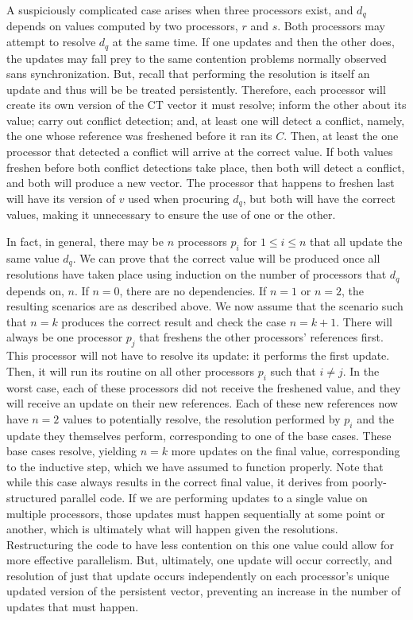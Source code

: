 A suspiciously complicated case arises when three processors exist, and $d_q$
depends on values computed by two processors, $r$ and $s$. Both processors may
attempt to resolve $d_q$ at the same time. If one updates and then the other
does, the updates may fall prey to the same contention problems normally
observed sans synchronization. But, recall that performing the resolution is
itself an update and thus will be be treated persistently. Therefore, each
processor will create its own version of the CT vector it must resolve; inform
the other about its value; carry out conflict detection; and, at least one will
detect a conflict, namely, the one whose reference was freshened before it ran
its $C$. Then, at least the one processor that detected a conflict will arrive
at the correct value. If both values freshen before both conflict detections
take place, then both will detect a conflict, and both will produce a new
vector. The processor that happens to freshen last will have its version of $v$
used when procuring $d_q$, but both will have the correct values, making it
unnecessary to ensure the use of one or the other.

In fact, in general, there may be $n$ processors $p_i$ for $1 \leq i \leq n$
that all update the same value $d_q$.  We can prove that the correct value will
be produced once all resolutions have taken place using induction on the number
of processors that $d_q$ depends on, $n$. If $n=0$, there are no dependencies.
If $n=1$ or $n=2$, the resulting scenarios are as described above. We now assume
that the scenario such that $n=k$ produces the correct result and check the case
$n=k+1$. There will always be one processor $p_j$ that freshens the other
processors' references first. This processor will not have to resolve its
update: it performs the first update. Then, it will run its routine on all
other processors $p_i$ such that $i \neq j$. In the worst case, each of these
processors did not receive the freshened value, and they will receive an update
on their new references. Each of these new references now have $n=2$ values to
potentially resolve, the resolution performed by $p_i$ and the update they
themselves perform, corresponding to one of the base cases. These base cases
resolve, yielding $n=k$ more updates on the final value, corresponding to the
inductive step, which we have assumed to function properly. Note that while this
case always results in the correct final value, it derives from
poorly-structured parallel code. If we are performing updates to a single value
on multiple processors, those updates must happen sequentially at some point or
another, which is ultimately what will happen given the resolutions.
Restructuring the code to have less contention on this one value could allow for
more effective parallelism. But, ultimately, one update will occur correctly,
and resolution of just that update occurs independently on each processor's
unique updated version of the persistent vector, preventing an increase in the
number of updates that must happen.

